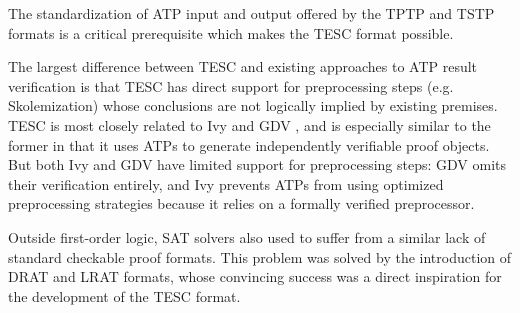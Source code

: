 \documentclass[12pt]{article}
\begin{document}
The standardization of ATP input and output offered by the TPTP \cite{} and TSTP \cite{} formats is 
a critical prerequisite which makes the TESC format possible. 

The largest difference between TESC and existing approaches to ATP result verification is that TESC has 
direct support for preprocessing steps (e.g. Skolemization) whose conclusions are not logically implied 
by existing premises. TESC is most closely related to Ivy \cite{} and GDV \cite{}, and is especially 
similar to the former in that it uses ATPs to generate independently verifiable proof objects.
But both Ivy and GDV have limited support for preprocessing steps: GDV omits their verification entirely,
and Ivy prevents ATPs from using optimized preprocessing strategies because it relies on a formally verified 
preprocessor. 

Outside first-order logic, SAT solvers also used to suffer from a similar lack of standard checkable proof formats.
This problem was solved by the introduction of DRAT \cite{wetzler2014drat} and LRAT \cite{cruz2017efficient} formats,
whose convincing success was a direct inspiration for the development of the TESC format.
\end{document}
